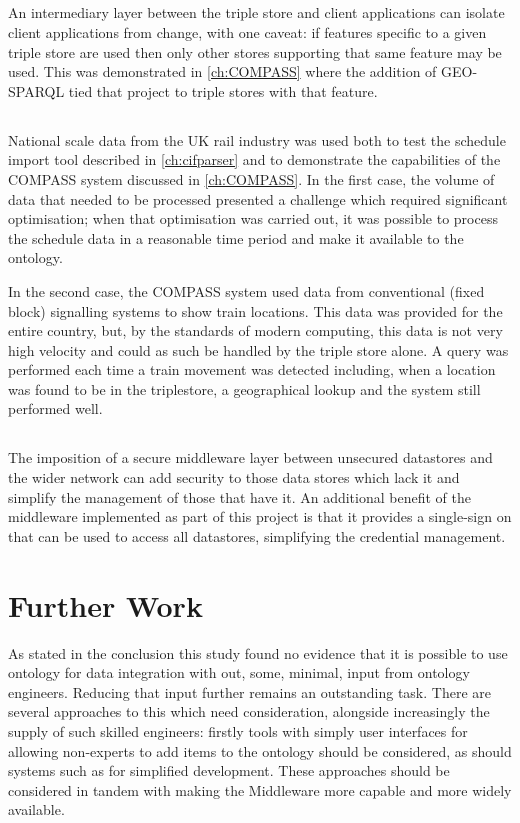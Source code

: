 \subsection{\QuestionChange}
An intermediary layer between the triple store and client applications can isolate client applications from change, with one caveat: if features specific to a given triple store are used then only other stores supporting that same feature may be used. This was demonstrated in \autoref{ch:COMPASS} where the addition of GEO-SPARQL tied that project to triple stores with that feature.

\subsection{\QuestionCanOntologyScale}
National scale data from the UK rail industry was used both to test the schedule import tool described in \autoref{ch:cifparser} and to demonstrate the capabilities of the COMPASS system discussed in \autoref{ch:COMPASS}. In the first case, the volume of data that needed to be processed presented a challenge which required significant optimisation; when that optimisation was carried out, it was possible to process the schedule data in a reasonable time period and make it available to the ontology. 

In the second case, the COMPASS system used data from conventional (fixed block) signalling systems to show train locations. This data was provided for the entire country, but, by the standards of modern computing, this data is not very high velocity and could as such be handled by the triple store alone. A query was performed each time a train movement was detected including, when a location was found to be in the triplestore, a geographical lookup and the system still performed well.

\subsection{\QuestionSecurity}
The imposition of a secure middleware layer between unsecured datastores and the wider network can add security to those data stores which lack it and simplify the management of those that have it. An additional benefit of the middleware implemented as part of this project is that it provides a single-sign on that can be used to access all datastores, simplifying the credential management.


\section{Further Work}
As stated in the conclusion this study found no evidence that it is possible to use ontology for data integration with out, some, minimal, input from ontology engineers. Reducing that input further remains an outstanding task. There are several approaches to this which need consideration, alongside increasingly the supply of such skilled engineers: firstly tools with simply user interfaces for allowing non-experts to add items to the ontology should be considered, as should systems such as  for simplified development. These approaches should be considered in tandem with making the Middleware more capable and more widely available. 

